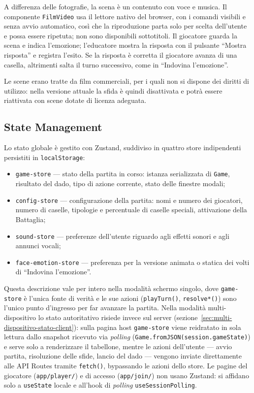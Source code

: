 \documentclass[12pt]{report}
\begin{document}
A differenza delle fotografie, la scena è un contenuto con voce e musica. Il componente \texttt{FilmVideo} usa il lettore nativo del browser, con i comandi visibili e senza avvio automatico, così che la riproduzione parta solo per scelta dell'utente e possa essere ripetuta; non sono disponibili sottotitoli. Il giocatore guarda la scena e indica l'emozione; l'educatore mostra la risposta con il pulsante ``Mostra risposta'' e registra l'esito. Se la risposta è corretta il giocatore avanza di una casella, altrimenti salta il turno successivo, come in ``Indovina l'emozione''.

Le scene erano tratte da film commerciali, per i quali non si dispone dei diritti di utilizzo: nella versione attuale la sfida è quindi disattivata e potrà essere riattivata con scene dotate di licenza adeguata.

\subsection{State Management}

Lo stato globale è gestito con Zustand, suddiviso in quattro store indipendenti persistiti in \texttt{localStorage}:

\begin{itemize}
    \item \texttt{game-store} --- stato della partita in corso: istanza serializzata di \texttt{Game}, risultato del dado, tipo di azione corrente, stato delle finestre modali;
    \item \texttt{config-store} --- configurazione della partita: nomi e numero dei giocatori, numero di caselle, tipologie e percentuale di caselle speciali, attivazione della Battaglia;
    \item \texttt{sound-store} --- preferenze dell'utente riguardo agli effetti sonori e agli annunci vocali;
    \item \texttt{face-emotion-store} --- preferenza per la versione animata o statica dei volti di ``Indovina l'emozione''.
\end{itemize}

Questa descrizione vale per intero nella modalità schermo singolo, dove \texttt{game-store} è l'unica fonte di verità e le sue azioni (\texttt{playTurn()}, \texttt{resolve*()}) sono l'unico punto d'ingresso per far avanzare la partita.
Nella modalità multi-dispositivo lo stato autoritativo risiede invece sul server (sezione~\ref{sec:multi-dispositivo-stato-client}): sulla pagina host \texttt{game-store} viene reidratato in sola lettura dallo snapshot ricevuto via \textit{polling} (\texttt{Game.fromJSON(session.gameState)}) e serve solo a renderizzare il tabellone, mentre le azioni dell'utente --- avvio partita, risoluzione delle sfide, lancio del dado --- vengono inviate direttamente alle API Routes tramite \texttt{fetch()}, bypassando le azioni dello store. Le pagine del giocatore (\texttt{app/player/}) e di accesso (\texttt{app/join/}) non usano Zustand: si affidano solo a \texttt{useState} locale e all'hook di \textit{polling} \texttt{useSessionPolling}.
\end{document}
